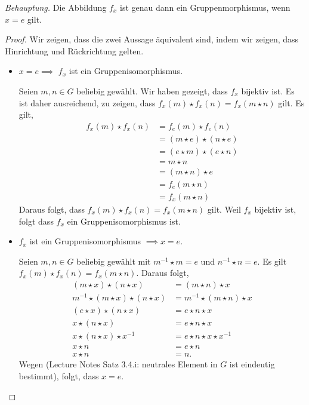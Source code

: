 \documentclass[12pt]{extarticle}
\begin{document}
\textit{Behauptung.}  Die Abbildung \(f_x\) ist genau dann ein
Gruppenmorphismus, wenn \(x = e\) gilt.
\begin{proof}

  Wir zeigen, dass die zwei Aussage äquivalent sind, indem wir zeigen,
  dass Hinrichtung und Rückrichtung gelten.
  \begin{itemize}
  \item \(x = e \implies\) \(f_x\) ist ein Gruppenisomorphismus.

    Seien \(m, n \in G\) beliebig gewählt.  Wir haben gezeigt, dass
    \(f_x\) bijektiv ist.  Es ist daher ausreichend, zu zeigen, dass
    \(f_x(m) \star f_x(n) = f_x(m \star n)\) gilt.  Es gilt,
\begin{align*}
  f_x(m) \star f_x(n) &= f_e(m) \star f_e(n) \tag*{Voraussetzung}\\
                      &= (m \star e) \star (n \star e)\\
                      &= (e \star m) \star (e \star n)
                        \tag*{Lecture Notes Satz 3.4.i}\\
                      &= m \star n \\
                      &= (m \star n) \star e \\
                      &= f_e(m \star n) \\
                      &= f_x(m \star n)
\end{align*}
Daraus folgt, dass \(f_x(m) \star f_x(n) = f_x(m \star n)\) gilt.  Weil
\(f_x\) bijektiv ist, folgt dass \(f_x\) ein Gruppenisomorphismus ist.
\item \(f_x\) ist ein Gruppenisomorphismus \(\implies x = e\).

  Seien \(m, n \in G\) beliebig gewählt mit \(m^{-1} \star m = e\) und
  \(n^{-1} \star n = e\).  Es gilt
  \(f_x(m) \star f_x(n) = f_x(m \star n)\).  Daraus folgt,
\begin{align*}
  (m \star x) \star (n \star x) &= (m \star n) \star x\\
  m^{-1} \star (m \star x) \star (n \star x)
                                &= m^{-1} \star (m \star n) \star x\\
  (e \star x) \star (n \star x) &= e \star n \star x\\
  x \star (n \star x) &= e \star n \star x\\
  x \star (n \star x) \star x^{-1} &= e \star n \star x \star x^{-1}\\
  x \star n &= e \star n\\
  x \star n &= n.
\end{align*}
Wegen (Lecture Notes Satz 3.4.i: neutrales Element in \(G\) ist
eindeutig bestimmt), folgt, dass \(x = e\).
  \end{itemize}
\end{proof}
\end{document}
